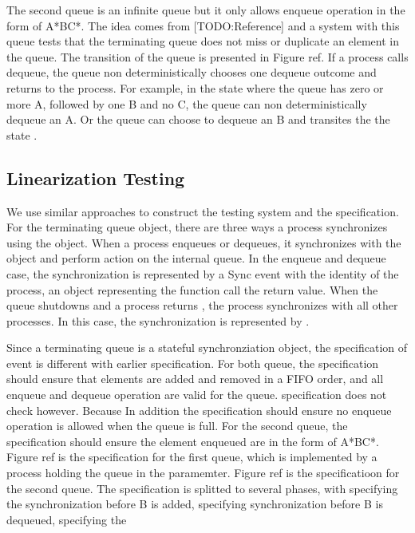 \documentclass[a4paper, 12pt]{article}
\begin{document}
The second queue is an infinite queue but it only allows enqueue operation in the form of A*BC*. The idea comes from [TODO:Reference] and a system with this queue tests that the terminating queue does not miss or duplicate an element in the queue. The transition of the queue is presented in Figure ref. If a process calls dequeue, the queue non deterministically chooses one dequeue outcome and returns to the process. For example, in the state  where the queue has zero or more A, followed by one B and no C, the queue can non deterministically dequeue an A. Or the queue can choose to dequeue an B and transites the the state .

\subsection{Linearization Testing}
We use similar approaches to construct the testing system and the specification. For the terminating queue object, there are three ways a process synchronizes using the object. When a process enqueues or dequeues, it synchronizes with the object and perform action on the internal queue. In the enqueue and dequeue case, the synchronization is represented by a Sync event with the identity of the process, an object representing the function call the return value. When the queue shutdowns and a process returns , the process synchronizes with all other processes. In this case, the synchronization is represented by . 

Since a terminating queue is a stateful synchronziation object, the specification of  event is different with earlier  specification. For both queue, the  specification should ensure that elements are added and removed in a FIFO order, and all enqueue and dequeue operation are valid for the queue.  specification does not check  however. Because  In addition the  specification should ensure no enqueue operation is allowed when the queue is full. For the second queue, the  specification should ensure the element enqueued are in the form of A*BC*. Figure ref is the specification for the first queue, which is implemented by a process holding the queue in the paramemter. Figure ref is the specificatioon for the second queue. The specification is splitted to several phases, with  specifying the synchronization before B is added,  specifying synchronization before B is dequeued,  specifying the 
\end{document}
